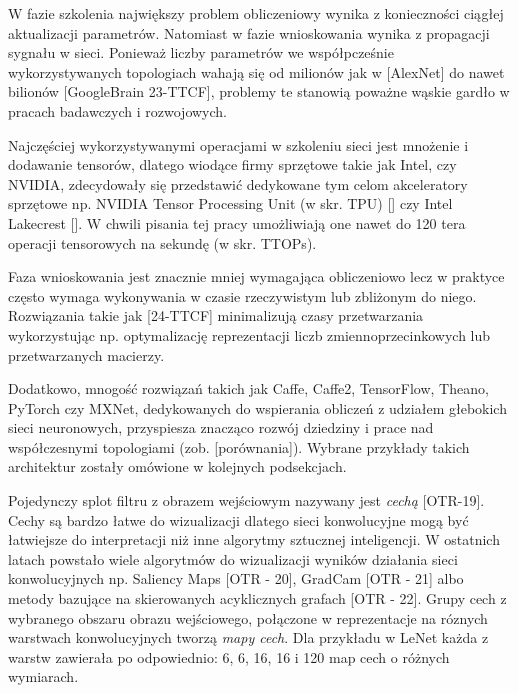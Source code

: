 W fazie szkolenia największy problem obliczeniowy wynika z konieczności ciągłej aktualizacji parametrów. Natomiast w fazie wnioskowania wynika z propagacji sygnału w sieci. Ponieważ liczby parametrów we współpcześnie wykorzystywanych topologiach wahają się od milionów jak w [AlexNet] do nawet bilionów [GoogleBrain 23-TTCF], problemy te stanowią poważne wąskie gardło w pracach badawczych i rozwojowych.

Najczęściej wykorzystywanymi operacjami w szkoleniu sieci jest mnożenie i dodawanie tensorów, dlatego wiodące firmy sprzętowe takie jak Intel, czy NVIDIA, zdecydowały się przedstawić dedykowane tym celom akceleratory sprzętowe np. NVIDIA Tensor Processing Unit (w skr. TPU) [] czy Intel Lakecrest []. W chwili pisania tej pracy umożliwiają one nawet do 120 tera operacji tensorowych na sekundę (w skr. TTOPs).

Faza wnioskowania jest znacznie mniej wymagająca obliczeniowo lecz w praktyce często wymaga wykonywania w czasie rzeczywistym lub zbliżonym do niego. Rozwiązania takie jak [24-TTCF] minimalizują czasy przetwarzania wykorzystując np. optymalizację reprezentacji liczb zmiennoprzecinkowych lub przetwarzanych macierzy.

Dodatkowo, mnogość rozwiązań takich jak Caffe, Caffe2, TensorFlow, Theano, PyTorch czy MXNet, dedykowanych do wspierania obliczeń z udziałem głebokich sieci neuronowych, przyspiesza znacząco rozwój dziedziny i prace nad współczesnymi topologiami (zob. [porównania]). Wybrane przykłady takich architektur zostały omówione w kolejnych podsekcjach. 



Pojedynczy splot filtru z obrazem wejściowym nazywany jest \textit{cechą} [OTR-19]. Cechy są bardzo łatwe do wizualizacji dlatego sieci konwolucyjne mogą być łatwiejsze do interpretacji niż inne algorytmy sztucznej inteligencji. W ostatnich latach powstało wiele algorytmów do wizualizacji wyników działania sieci konwolucyjnych np. Saliency Maps [OTR - 20], GradCam [OTR - 21] albo metody bazujące na skierowanych acyklicznych grafach [OTR - 22]. Grupy cech z wybranego obszaru obrazu wejściowego, połączone w reprezentacje na róznych warstwach konwolucyjnych tworzą \textit{mapy cech}. Dla przykładu w LeNet każda z warstw zawierała po odpowiednio: 6, 6, 16, 16 i 120 map cech o różnych wymiarach. 

